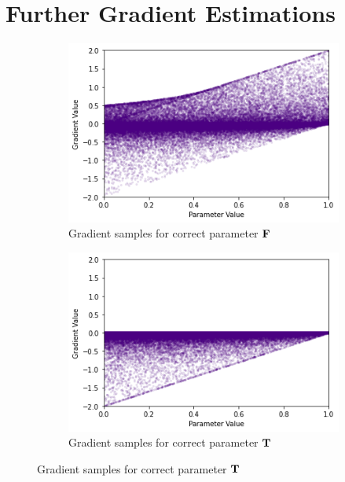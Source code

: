 \chapter{Further Gradient Estimations}
\label{section:moregradients}

\begin{figure}[ht]
    \centering
    \begin{subfigure}[b]{0.47\textwidth}
        \centering
        \includegraphics[width=\textwidth]{imgs/grad_prod_2_falseparam.png}
        \caption{Gradient samples for correct parameter $\textbf{F}$}
        \label{fig:conjgrad2false}
    \end{subfigure}
    \begin{subfigure}[b]{0.47\textwidth}
        \centering
        \includegraphics[width=\textwidth]{imgs/grad_prod_2_trueparam.png}
        \caption{Gradient samples for correct parameter $\textbf{T}$}
        \label{fig:conjgrad2true}

\end{subfigure}
\end{figure}
